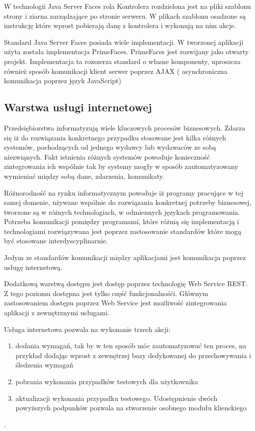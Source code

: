W technologii Java Server Faces rola Kontrolera rozdzielona jest na pliki szablonu strony i ziarna zarządzające po stronie serweru. W plikach szablonu osadzone są instrukcję które wprost pobierają danę z kontrolera i wykonują na nim akcje.

Standard Java Server Faces posiada wiele implementacji. W tworzonej aplikacji użyta została implementacja PrimeFaces\cite{primeFaces}. PrimeFaces jest rozwijany jako otwarty projekt. Implementacja ta rozszerza standard o własne komponenty, uproszcza również sposób komunikacji klient serwer poprzez AJAX ( asynchroniczna komunikacja poprzez język JavaScript)

\subsection{Warstwa usługi internetowej}

Przedsiębiorstwa informatyzują wiele kluczowych procesów biznesowych. Zdarza się iż do rozwiązania konkretnego przypadku stosowane jest kilka różnych systemów, pochodzących od jednego wydawcy lub wydawaców ze sobą niezwiąnych. Fakt istnienia różnych systemów powoduje konieczność zintegrowania ich wspólnie tak by systemy mogły w sposób zautomatyzowany wymieniać między sobą dane, zdarzenia, komunikaty.

Różnorodność na rynku informatycznym powoduje iż programy pracujące w tej samej domenie, używane wspólnie do rozwiązania konkretnej potrzeby biznesowej, tworzone są w różnych technologiach, w odmiennych językach programowania. Potrzeba komunikacji pomiędzy programami, które różnią się implementacją i technologiami rozwiązywana jest poprzez zastosowanie standardów które mogą być stosowane interdyscyplinarnie.

Jedym ze standardów komunikacji między aplikacjami jest komunikacja poprzez usługę internetową. 

Dodatkową warstwą dostępu jest dostęp poprzez technologię Web Service REST. Z tego poziomu dostępna jest tylko część funkcjonalnośći. Głównym zastosowaniem dostępu poprzez Web Service jest możliwość zintegrowania aplikacji z zewnętrznymi usługami.



Usługa internetowa pozwala na wykonanie trzech akcji:
\begin{enumerate}
  \item dodania wymagań, tak by w ten sposób móc zautomatyzować ten proces, na przykład dodając wprost z zewnętrzej bazy dedykowanej do przechowywania i śledzenia wymagań
  \item pobrania wykonania przypadków testowych dla użytkownika
  \item aktualizacji wykonania przypadku testowego. Udostępnienie dwóch powyższych podpunków pozwala na stworzenie osobnego modułu klienckiego
\end{enumerate}.

